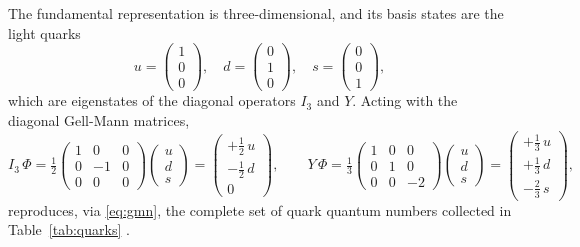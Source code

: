 The fundamental representation is three-dimensional, and its basis states are the
light quarks
\begin{equation}
    u = \begin{pmatrix} 1 \\ 0 \\ 0 \end{pmatrix}, \quad
    d = \begin{pmatrix} 0 \\ 1 \\ 0 \end{pmatrix}, \quad
    s = \begin{pmatrix} 0 \\ 0 \\ 1 \end{pmatrix},
\end{equation}
which are eigenstates of the diagonal operators $I_3$ and $Y$. Acting with the
diagonal Gell-Mann matrices,
\begin{equation}
    I_3\,\Phi = \tfrac{1}{2}\!
    \begin{pmatrix} 1&0&0\\0&-1&0\\0&0&0 \end{pmatrix}\!
    \begin{pmatrix} u\\d\\s \end{pmatrix}
    = \begin{pmatrix} +\tfrac{1}{2}\,u\\ -\tfrac{1}{2}\,d\\ 0 \end{pmatrix},
    \qquad
    Y\,\Phi = \tfrac{1}{3}\!
    \begin{pmatrix} 1&0&0\\0&1&0\\0&0&-2 \end{pmatrix}\!
    \begin{pmatrix} u\\d\\s \end{pmatrix}
    = \begin{pmatrix} +\tfrac{1}{3}\,u\\ +\tfrac{1}{3}\,d\\ -\tfrac{2}{3}\,s \end{pmatrix},
\end{equation}
reproduces, via \eqref{eq:gmn}, the complete set of quark quantum numbers collected
in Table~\ref{tab:quarks} \cite[Ch.~7]{Amsler2018}.

